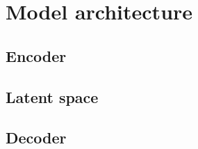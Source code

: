 \chapter{Model architecture}\label{chap:architecture}
\section{Encoder}
\section{Latent space}
\section{Decoder}
